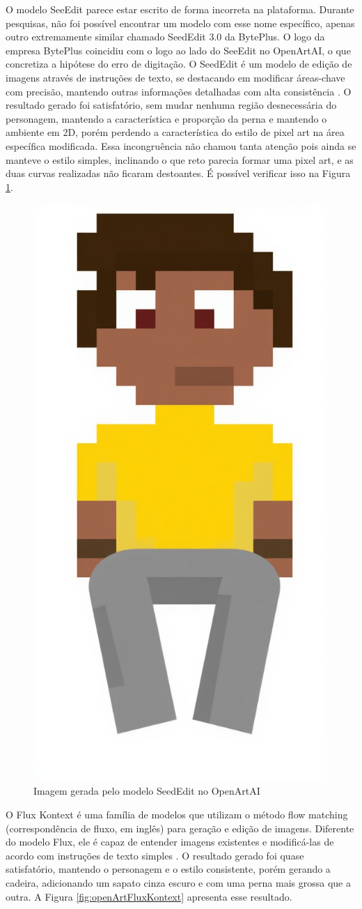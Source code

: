 O modelo SeeEdit parece estar escrito de forma incorreta na plataforma. Durante pesquisas, não foi possível encontrar um modelo com esse nome específico, apenas outro extremamente similar chamado SeedEdit 3.0 da BytePlus. O logo da empresa BytePlus coincidiu com o logo ao lado do SeeEdit no OpenArtAI, o que concretiza a hipótese do erro de digitação. O SeedEdit é um modelo de edição de imagens através de instruções de texto, se destacando em modificar áreas-chave com precisão, mantendo outras informações detalhadas com alta consistência \cite{modelark-byteplus_2025}. O resultado gerado foi satisfatório, sem mudar nenhuma região desnecessária do personagem, mantendo a característica e proporção da perna e mantendo o ambiente em 2D, porém perdendo a característica do estilo de pixel art na área específica modificada. Essa incongruência não chamou tanta atenção pois ainda se manteve o estilo simples, inclinando o que reto parecia formar uma pixel art, e as duas curvas realizadas não ficaram destoantes. É possível verificar isso na Figura \ref{fig:openArtSeedEdit}.

\begin{figure}[htbp]
    \centering
    \caption{\small Imagem gerada pelo modelo SeedEdit no OpenArtAI}
    \label{fig:openArtSeedEdit}
    \includegraphics[width=0.2\linewidth]{figs/OpenArtAI/seeEdit.png}
\end{figure}

O Flux Kontext é uma família de modelos que utilizam o método flow matching (correspondência de fluxo, em inglês) para geração e edição de imagens. Diferente do modelo Flux, ele é capaz de entender imagens existentes e modificá-las de acordo com instruções de texto simples \cite{blackforestlabs_2025}. O resultado gerado foi quase satisfatório, mantendo o personagem e o estilo consistente, porém gerando a cadeira, adicionando um sapato cinza escuro e com uma perna mais grossa que a outra. A Figura \ref{fig:openArtFluxKontext} apresenta esse resultado.

